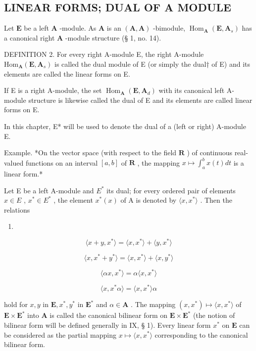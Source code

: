 \subsection{LINEAR FORMS; DUAL OF A MODULE}

Let \(\mathbf{E}\) be a left \(\mathbf{A}\) -module. As \(\mathbf{A}\) is an \((\mathbf{A}, \mathbf{A})\) -bimodule, \(\operatorname{Hom}_{\mathbf{A}}(\mathbf{E}, \mathbf{A}_s)\) has a canonical right \(\mathbf{A}\) -module structure (§ 1, no. 14).

DEFINITION 2. For every right A-module E, the right A-module \(\mathrm{Hom}_{\mathbf{A}}(\mathbf{E},\mathbf{A}_{s})\) is called the dual module of E (or simply the dual† of E) and its elements are called the linear forms on E.

If E is a right A-module, the set \(\operatorname{Hom}_{\mathbf{A}}(\mathbf{E}, \mathbf{A}_{d})\) with its canonical left A-module structure is likewise called the dual of E and its elements are called linear forms on E.

In this chapter, E* will be used to denote the dual of a (left or right) A-module E.

Example. *On the vector space (with respect to the field \(\mathbf{R}\) ) of continuous real-valued functions on an interval \([a, b]\) of \(\mathbf{R}\) , the mapping \(x \mapsto \int_{a}^{b} x(t) dt\) is a linear form.*

Let E be a left A-module and \(E^{*}\) its dual; for every ordered pair of elements \(x \in E\) , \(x^{*} \in E^{*}\) , the element \(x^{*}(x)\) of A is denoted by \(\langle x, x^{*} \rangle\) . Then the relations

\begin{enumerate}
\def\labelenumi{(\arabic{enumi})}
\setcounter{enumi}{8}
\tightlist
\item
\end{enumerate}

\[
\langle x + y, x ^ {*} \rangle = \langle x, x ^ {*} \rangle + \langle y, x ^ {*} \rangle\tag{10}
\]

\[
\langle x, x ^ {*} + y ^ {*} \rangle = \langle x, x ^ {*} \rangle + \langle x, y ^ {*} \rangle\tag{11}
\]

\[
\langle \alpha x, x ^ {*} \rangle = \alpha \langle x, x ^ {*} \rangle\tag{12}
\]

\[
\langle x, x ^ {*} \alpha \rangle = \langle x, x ^ {*} \rangle \alpha
\]

hold for \(x, y\) in \(\mathbf{E}, x^*, y^*\) in \(\mathbf{E}^*\) and \(\alpha \in \mathbf{A}\) . The mapping \((x, x^*) \mapsto \langle x, x^* \rangle\) of \(\mathbf{E} \times \mathbf{E}^*\) into \(\mathbf{A}\) is called the canonical bilinear form on \(\mathbf{E} \times \mathbf{E}^*\) (the notion of bilinear form will be defined generally in IX, § 1). Every linear form \(x^*\) on \(\mathbf{E}\) can be considered as the partial mapping \(x \mapsto \langle x, x^* \rangle\) corresponding to the canonical bilinear form.

